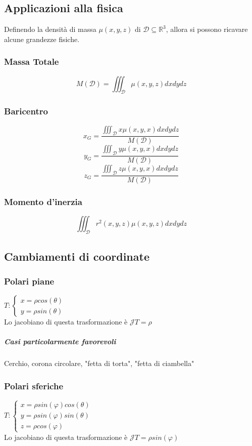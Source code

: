 \documentclass[10pt,a4paper]{report}
\begin{document}
		\subsection*{Applicazioni alla fisica}
		Definendo la densità  di massa $ \mu (x,y,z) $ di $\mathcal{D}\subseteq \mathbb{R}^{3}$, allora si possono ricavare alcune grandezze fisiche.
			\subsubsection{Massa Totale}
			\[ M(\mathcal{D})= \iiint_{\mathcal{D}} \mu(x,y,z) dx dy dz \]
			
			\subsubsection{Baricentro}
			\[ x_{G}=\frac{\iiint_{\mathcal{D}} x \mu (x,y,x) dx dy dz}{ M(\mathcal{D})} \]
			\[ y_{G}=\frac{\iiint_{\mathcal{D}} y \mu (x,y,x) dx dy dz}{ M(\mathcal{D})} \]
			\[ z_{G}=\frac{\iiint_{\mathcal{D}} z \mu (x,y,x) dx dy dz}{ M(\mathcal{D})} \]
			
			\subsubsection{Momento d'inerzia}
			\[ \iiint_{\mathcal{D}} r^{2}(x,y,z) \mu(x,y,z) dx dy dz \]

		\subsection*{Cambiamenti di coordinate}
			\subsubsection{Polari piane}
			$ T: \begin{cases} 
				x=\rho cos(\theta) \\ 
				y=\rho sin(\theta)
			\end{cases} $
            \\
           	Lo jacobiano di questa trasformazione è $\mathcal{J}T=\rho $
				\subparagraph{Casi particolarmente favorevoli}
				Cerchio, corona circolare, "fetta di torta", "fetta di ciambella"
			\subsubsection{Polari sferiche}
			$ T: \begin{cases} 
				x=\rho sin(\varphi)cos(\theta) \\ 
				y=\rho sin(\varphi)sin(\theta) \\
				z=\rho cos(\varphi)
			\end{cases} $
			\\
			Lo jacobiano di questa trasformazione è $\mathcal{J}T=\rho sin(\varphi) $
			
\end{document}
